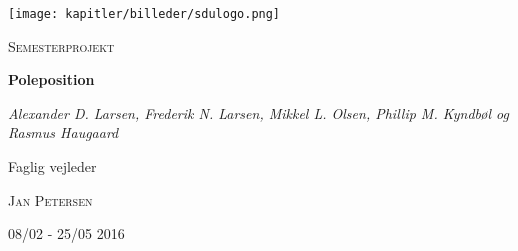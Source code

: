 
\begin{titlepage}
	\centering
	\texttt{[image: kapitler/billeder/sdulogo.png]}
	\vspace{1cm}
	{\scshape\Large Semesterprojekt\par}
	\vspace{1.5cm}
	{\huge\bfseries Poleposition\par}
	\vspace{2cm}
	{\Large\itshape Alexander D. Larsen, Frederik N. Larsen, Mikkel L. Olsen, Phillip M. Kyndbøl og Rasmus Haugaard\par}
	\vfill
	Faglig vejleder\par
	\textsc{Jan Petersen}

	\vfill

	{\large 08/02 - 25/05 2016}
\end{titlepage}
